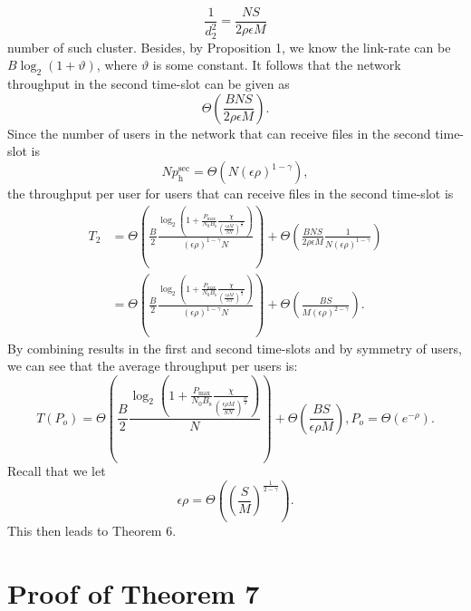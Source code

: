 \documentclass[journal,draftclsnofoot,onecolumn,12pt,twoside]{IEEEtran}
\begin{document}
\begin{equation}
\frac{1}{d_2^2}=\frac{N S}{2\rho\epsilon M}
\end{equation}
number of such cluster. Besides, by Proposition 1, we know the link-rate can be $B\log_2(1+\vartheta)$, where $\vartheta$ is some constant. It follows that the network throughput in the second time-slot can be given as
\begin{equation}
\Theta\left(\frac{BN S}{2\rho\epsilon M}\right).
\end{equation}
Since the number of users in the network that can receive files in the second time-slot is
\begin{equation}
Np_{\text{h}}^{\text{sec}}=\Theta\left(N(\epsilon\rho)^{1-\gamma}\right),
\end{equation}
the throughput per user for users that can receive files in the second time-slot is
\begin{equation}
\begin{aligned}
T_2&=\Theta\left(\frac{B}{2}\frac{\log_2\left(1+\frac{P_{\text{max}}}{N_0B_{\text{s}}}\frac{\chi}{\left(\frac{\epsilon\rho M}{SN}\right)^\frac{\alpha}{2}}\right)}{(\epsilon\rho)^{1-\gamma}N}\right)+\Theta\left(\frac{BN S}{2\rho\epsilon M}\frac{1}{N(\epsilon\rho)^{1-\gamma}}\right)\\
&=\Theta\left(\frac{B}{2}\frac{\log_2\left(1+\frac{P_{\text{max}}}{N_0B_{\text{s}}}\frac{\chi}{\left(\frac{\epsilon\rho M}{SN}\right)^\frac{\alpha}{2}}\right)}{(\epsilon\rho)^{1-\gamma}N}\right)+\Theta\left(\frac{BS}{M(\epsilon\rho)^{2-\gamma}}\right).
\end{aligned}
\end{equation}
By combining results in the first and second time-slots and by symmetry of users, we can see that the average throughput per users is:
\begin{equation}
T(P_o)=\Theta\left(\frac{B}{2}\frac{\log_2\left(1+\frac{P_{\text{max}}}{N_0B_{\text{s}}}\frac{\chi}{\left(\frac{\epsilon\rho M}{SN}\right)^\frac{\alpha}{2}}\right)}{N}\right)+\Theta\left(\frac{BS}{\epsilon\rho M}\right),P_o= \Theta\left(e^{-\rho}\right).
\end{equation}
Recall that we let 
\begin{equation}
\epsilon\rho=\Theta\left(\left(\frac{S}{M}\right)^{\frac{1}{2-\gamma}}\right).
\end{equation}
This then leads to Theorem 6.

\section{Proof of Theorem 7}
\end{document}
